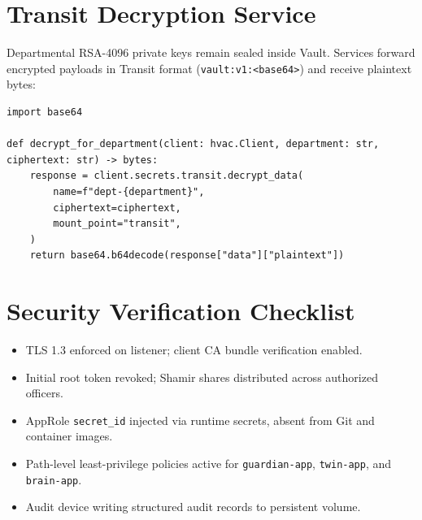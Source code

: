 \documentclass[11pt,a4paper]{article}
\begin{document}
\section{Transit Decryption Service}
Departmental RSA-4096 private keys remain sealed inside Vault. Services forward encrypted payloads in Transit format (\texttt{vault:v1:<base64>}) and receive plaintext bytes:
\begin{lstlisting}
import base64

def decrypt_for_department(client: hvac.Client, department: str, ciphertext: str) -> bytes:
    response = client.secrets.transit.decrypt_data(
        name=f"dept-{department}",
        ciphertext=ciphertext,
        mount_point="transit",
    )
    return base64.b64decode(response["data"]["plaintext"])
\end{lstlisting}

\section{Security Verification Checklist}
\begin{itemize}[leftmargin=*,itemsep=2pt]
  \item[\checkmark] TLS 1.3 enforced on listener; client CA bundle verification enabled.
  \item[\checkmark] Initial root token revoked; Shamir shares distributed across authorized officers.
  \item[\checkmark] AppRole \texttt{secret\_id} injected via runtime secrets, absent from Git and container images.
  \item[\checkmark] Path-level least-privilege policies active for \texttt{guardian-app}, \texttt{twin-app}, and \texttt{brain-app}.
  \item[\checkmark] Audit device writing structured audit records to persistent volume.
\end{itemize}
\end{document}
